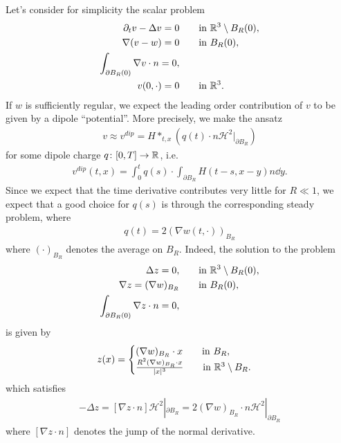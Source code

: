 \documentclass[abstracton, paper=a4, fontsize=11pt,DIV=12,bibliography=totoc]{scrartcl}
\begin{document}
Let's consider for simplicity the scalar problem 
\begin{align}
  \partial_t v  -  \Delta v  = 0 &\qquad  \text{in }  \mathbb{R}^3 \setminus B_R(0), \\
    \nabla (v - w) = 0   & \qquad  \text{in }   B_R(0), \\
    \int_{\partial B_R(0)}  \nabla v \cdot n = 0, \\
            v(0,\cdot) = 0 & \qquad  \text{in }  \mathbb{R}^3.
\end{align}
If $w$ is sufficiently regular, we expect the leading order contribution of $v$ to be given by a dipole \enquote{potential}. More precisely, we make the ansatz
\begin{align}
    v \approx v^{dip} = H \ast_{t,x} \left(q(t) \cdot  n \mathcal H^2|_{\partial B_R}\right)
\end{align}
for some dipole charge $q \colon [0,T] \to \mathbb{R}$, i.e.
\begin{align}
    v^{dip}(t,x) = \int_0^t q(s) \cdot \int_{\partial B_R} H(t-s,  x-y)  n \dd y.
\end{align}
Since we expect that the time derivative contributes very little for $R \ll 1$, we expect that a good choice for $q(s)$ is through the corresponding steady problem, where 
\begin{align} \label{dipole.q}
    q(t) = 2 (\nabla w(t,\cdot))_{B_R} 
\end{align}
where $(\cdot)_{B_R}$ denotes the average on  $B_R$.
Indeed, the solution to the problem 
\begin{align}
   \Delta z  = 0,  &\qquad  \text{in } \mathbb{R}^3 \setminus B_R(0), \\
    \nabla z = (\nabla w)_{B_R}   & \qquad  \text{in }  B_R(0), \\
    \int_{\partial B_R(0)}  \nabla z \cdot n = 0, &
\end{align}
is given by
\begin{align*}
    z(x) = \begin{cases} (\nabla w)_{B_R} \cdot x \qquad \text{in } B_R, \\
    \frac{R^2 (\nabla w)_{B_R} \cdot x}{|x|^3}\qquad \text{in } \mathbb{R}^3 \setminus B_R.
    \end{cases}
\end{align*}
which satisfies
\begin{align*}
    - \Delta z = [\nabla z \cdot n ] \mathcal H^2|_{\partial B_R}=  2 (\nabla w)_{B_R} \cdot n \mathcal H^2|_{\partial B_R}
\end{align*}
where $ [\nabla z \cdot n ]$ denotes the jump of the normal derivative.
\end{document}
